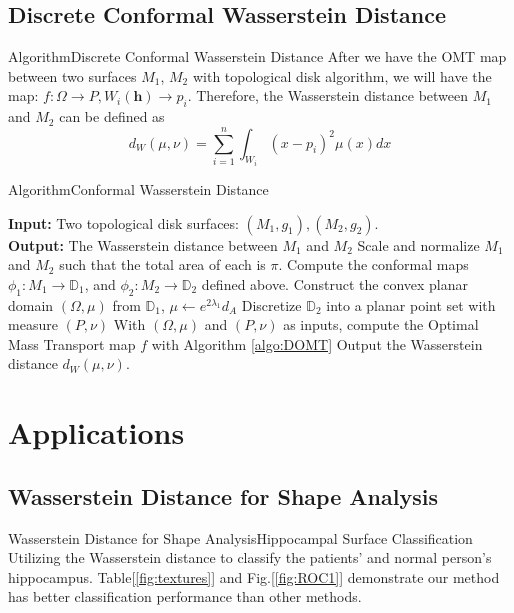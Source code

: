 \documentclass{beamer}
\theoremstyle{definition}
\begin{document}
\subsection{Discrete Conformal Wasserstein Distance}
\begin{frame}{Algorithm}{Discrete Conformal Wasserstein Distance}
After we have the OMT map between two surfaces $M_1$, $M_2$ with topological disk algorithm, we will have the map: $f:\Omega\rightarrow P, W_i(\mathbf{h})\rightarrow p_i$. Therefore, the Wasserstein distance between $M_1$ and $M_2$ can be defined as $$d_W(\mu,\nu)=\sum^n_{i=1}\int_{W_i}(x-p_i)^2\mu(x)dx$$
\end{frame}
\begin{frame}{Algorithm}{Conformal Wasserstein Distance}
\begin{algorithm}[H]
\caption{Computing Wasserstein Distance for Two Surfaces}
\begin{algorithmic}[1]
\REQUIRE \textbf{Input:} Two topological disk surfaces: $(M_1,g_1), (M_2,g_2)$. \\
\textbf{Output:} The Wasserstein distance between $M_1$ and $M_2$
\STATE Scale and normalize $M_1$ and $M_2$ such that the total area of each is $\pi$.
\STATE Compute the conformal maps $\phi_1:M_1\rightarrow \mathbb{D}_1$, and $\phi_2:M_2\rightarrow \mathbb{D}_2$ defined above.
\STATE Construct the convex planar domain $(\Omega,\mu)$ from $\mathbb{D}_1$, $\mu \leftarrow e^{2\lambda_1}d_A$
\STATE Discretize $\mathbb{D}_2$ into a planar point set with measure $(P,\nu)$
\STATE With $(\Omega, \mu)$ and $(P,\nu)$ as inputs, compute the Optimal Mass Transport map $f$ with Algorithm \ref{algo:DOMT}
\STATE Output the Wasserstein distance $d_W(\mu,\nu)$.
\end{algorithmic}
\label{Algo:WasDis}
\end{algorithm}
\end{frame}

\section{Applications}
\subsection{Wasserstein Distance for Shape Analysis}

\begin{frame}{Wasserstein Distance for Shape Analysis}{Hippocampal Surface Classification}
Utilizing the Wasserstein distance to classify the patients' and normal person's hippocampus.  
Table[\ref{fig:textures}] and Fig.[\ref{fig:ROC1}] demonstrate our method has better classification performance than other methods.
\end{frame}
\end{document}
